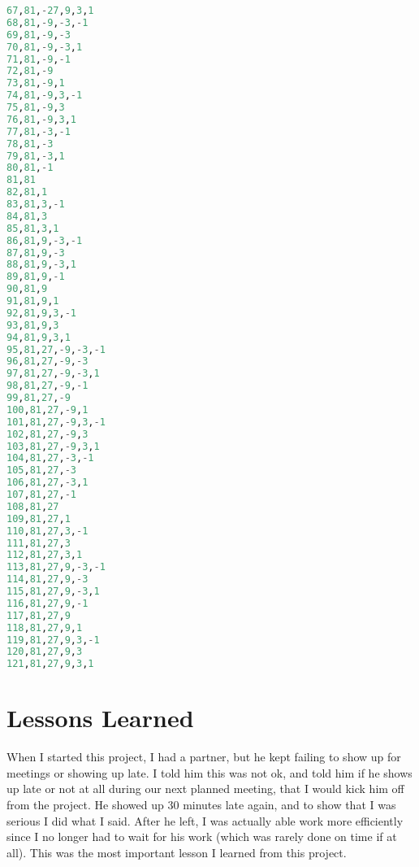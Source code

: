 \documentclass[12pt]{report}
\begin{document}
\begin{lstlisting}[language=Python, caption=lookup.csv]
67,81,-27,9,3,1
68,81,-9,-3,-1
69,81,-9,-3
70,81,-9,-3,1
71,81,-9,-1
72,81,-9
73,81,-9,1
74,81,-9,3,-1
75,81,-9,3
76,81,-9,3,1
77,81,-3,-1
78,81,-3
79,81,-3,1
80,81,-1
81,81
82,81,1
83,81,3,-1
84,81,3
85,81,3,1
86,81,9,-3,-1
87,81,9,-3
88,81,9,-3,1
89,81,9,-1
90,81,9
91,81,9,1
92,81,9,3,-1
93,81,9,3
94,81,9,3,1
95,81,27,-9,-3,-1
96,81,27,-9,-3
97,81,27,-9,-3,1
98,81,27,-9,-1
99,81,27,-9
100,81,27,-9,1
101,81,27,-9,3,-1
102,81,27,-9,3
103,81,27,-9,3,1
104,81,27,-3,-1
105,81,27,-3
106,81,27,-3,1
107,81,27,-1
108,81,27
109,81,27,1
110,81,27,3,-1
111,81,27,3
112,81,27,3,1
113,81,27,9,-3,-1
114,81,27,9,-3
115,81,27,9,-3,1
116,81,27,9,-1
117,81,27,9
118,81,27,9,1
119,81,27,9,3,-1
120,81,27,9,3
121,81,27,9,3,1
\end{lstlisting}

\chapter{Lessons Learned}
When I started this project, I had a partner, but he kept failing to show up for meetings or showing up late.
I told him this was not ok, and told him if he shows up late or not at all during our next planned meeting, that I would kick him off from the project.
He showed up 30 minutes late again, and to show that I was serious I did what I said. After he left, I was actually able work more efficiently since I no longer had to wait for his work (which was rarely done on time if at all).
This was the most important lesson I learned from this project.



 
\end{document}
